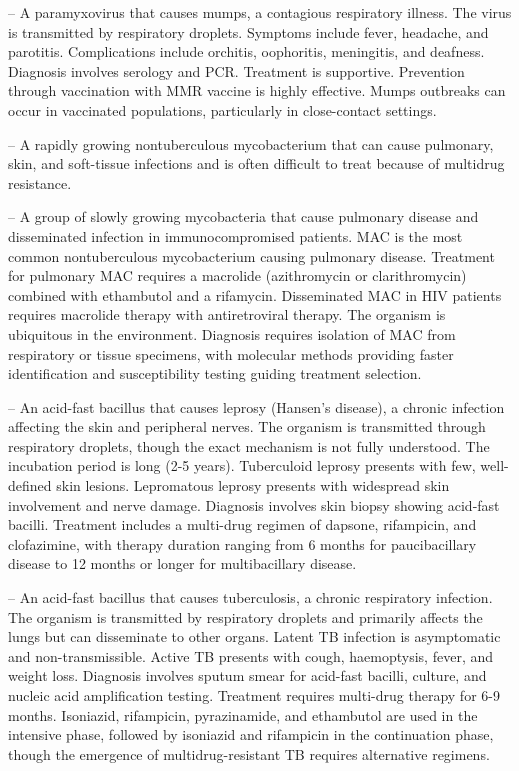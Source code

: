 -- A paramyxovirus that causes mumps, a contagious respiratory illness. The virus is transmitted by respiratory droplets. Symptoms include fever, headache, and parotitis. Complications include orchitis, oophoritis, meningitis, and deafness. Diagnosis involves serology and PCR. Treatment is supportive. Prevention through vaccination with MMR vaccine is highly effective. Mumps outbreaks can occur in vaccinated populations, particularly in close-contact settings.

-- A rapidly growing nontuberculous mycobacterium that can cause pulmonary, skin, and soft-tissue infections and is often difficult to treat because of multidrug resistance.

-- A group of slowly growing mycobacteria that cause pulmonary disease and disseminated infection in immunocompromised patients. MAC is the most common nontuberculous mycobacterium causing pulmonary disease. Treatment for pulmonary MAC requires a macrolide (azithromycin or clarithromycin) combined with ethambutol and a rifamycin. Disseminated MAC in HIV patients requires macrolide therapy with antiretroviral therapy. The organism is ubiquitous in the environment. Diagnosis requires isolation of MAC from respiratory or tissue specimens, with molecular methods providing faster identification and susceptibility testing guiding treatment selection.

-- An acid-fast bacillus that causes leprosy (Hansen's disease), a chronic infection affecting the skin and peripheral nerves. The organism is transmitted through respiratory droplets, though the exact mechanism is not fully understood. The incubation period is long (2-5 years). Tuberculoid leprosy presents with few, well-defined skin lesions. Lepromatous leprosy presents with widespread skin involvement and nerve damage. Diagnosis involves skin biopsy showing acid-fast bacilli. Treatment includes a multi-drug regimen of dapsone, rifampicin, and clofazimine, with therapy duration ranging from 6 months for paucibacillary disease to 12 months or longer for multibacillary disease.

-- An acid-fast bacillus that causes tuberculosis, a chronic respiratory infection. The organism is transmitted by respiratory droplets and primarily affects the lungs but can disseminate to other organs. Latent TB infection is asymptomatic and non-transmissible. Active TB presents with cough, haemoptysis, fever, and weight loss. Diagnosis involves sputum smear for acid-fast bacilli, culture, and nucleic acid amplification testing. Treatment requires multi-drug therapy for 6-9 months. Isoniazid, rifampicin, pyrazinamide, and ethambutol are used in the intensive phase, followed by isoniazid and rifampicin in the continuation phase, though the emergence of multidrug-resistant TB requires alternative regimens.

